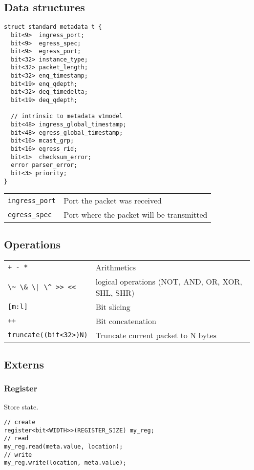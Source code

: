 \documentclass[a4paper, fontsize=8pt, landscape, DIV=1]{scrartcl}
\begin{document}
\begin{multicols*}{3}
  \subsection{Data structures}

  \begin{lstlisting}[style=P4style]
struct standard_metadata_t {
  bit<9>  ingress_port;
  bit<9>  egress_spec;
  bit<9>  egress_port;
  bit<32> instance_type;
  bit<32> packet_length;
  bit<32> enq_timestamp;
  bit<19> enq_qdepth;
  bit<32> deq_timedelta;
  bit<19> deq_qdepth;

  // intrinsic to metadata v1model
  bit<48> ingress_global_timestamp;
  bit<48> egress_global_timestamp;
  bit<16> mcast_grp;
  bit<16> egress_rid;
  bit<1>  checksum_error;
  error parser_error;
  bit<3> priority;
}\end{lstlisting}

\begin{tabularx}{\linewidth}{ l X }
  \lstinline[style=P4style]!ingress_port! &
  Port the packet was received \\
  \lstinline[style=P4style]!egress_spec! &
  Port where the packet will be transmitted \\
\end{tabularx}

\subsection{Operations}
  \begin{tabularx}{\linewidth}{ l X}
  \lstinline[style=P4style]!+ - *! &
  Arithmetics \\
  \lstinline[style=P4style]!\~ \& \| \^ >> <<! &
  logical operations (NOT, AND, OR, XOR, SHL, SHR) \\
  \lstinline[style=P4style]![m:l]! &
  Bit slicing  \\
  \lstinline[style=P4style]!++! &
  Bit concatenation \\
  \lstinline[style=P4style]!truncate((bit<32>)N)! &
  Truncate current packet to N bytes \\
  \end{tabularx}

\subsection{Externs}
  \subsubsection{Register}
  Store state.
  \begin{lstlisting}[style=P4style]
// create
register<bit<WIDTH>>(REGISTER_SIZE) my_reg;
// read
my_reg.read(meta.value, location);
// write
my_reg.write(location, meta.value);\end{lstlisting}


\end{multicols*}
\end{document}
